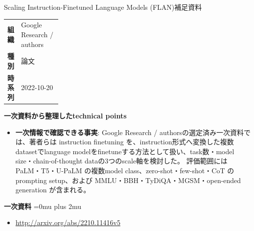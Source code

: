 \begin{technicalnote}{Scaling Instruction-Finetuned Language Models (FLAN)}{補足資料}
\begingroup
\begin{tabularx}{\linewidth}{@{}>{\bfseries}p{0.22\linewidth}X@{}}
組織 & Google Research / authors \\
種別 & 論文 \\
時系列 & 2022-10-20 \\
\end{tabularx}
\smallskip
{\bfseries 一次資料から整理したtechnical points}
\begin{itemize}[leftmargin=1.5em,itemsep=0.35em]
\item \textbf{一次情報で確認できる事実}: Google Research / authorsの選定済み一次資料では、著者らは instruction finetuning を、instruction形式へ変換した複数datasetでlanguage modelをfinetuneする方法として扱い、task数・model size・chain-of-thought dataの3つのscale軸を検討した。 評価範囲には PaLM・T5・U-PaLM の複数model class、zero-shot・few-shot・CoT のprompting setup、および MMLU・BBH・TyDiQA・MGSM・open-ended generation が含まれる。
\end{itemize}
\begin{minipage}{\linewidth}
\begin{samepage}
{\bfseries 一次資料}
\begingroup\sloppy
\Urlmuskip=0mu plus 2mu\relax
\begin{itemize}[leftmargin=1.5em,itemsep=0.25em]
\item {\scriptsize\url{http://arxiv.org/abs/2210.11416v5}}
\end{itemize}
\endgroup
\end{samepage}
\end{minipage}
\endgroup
\end{technicalnote}
\medskip

